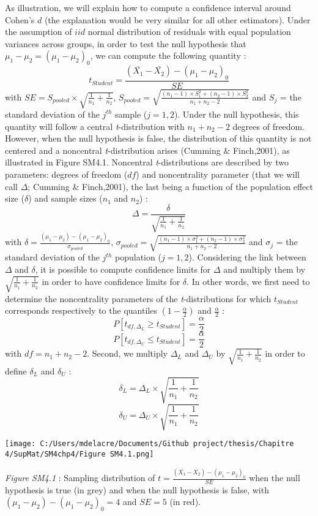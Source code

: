 \documentclass[
  english,
  man,mask,floatsintext]{apa6}
\begin{document}
As illustration, we will explain how to compute a confidence interval around Cohen's \(d\) (the explanation would be very similar for all other estimators). Under the assumption of \(iid\) normal distribution of residuals with equal population variances across groups, in order to test the null hypothesis that \(\mu_1-\mu_2= (\mu_1-\mu_2)_0\), we can compute the following quantity :
\begin{equation*} 
t_{Student}=\frac{(\bar{X_1}-\bar{X_2})-(\mu_1-\mu_2)_0}{SE}
\label{eq:tstudent}
\end{equation*}
with \(SE = S_{pooled} \times \sqrt{\frac{1}{n_1}+\frac{1}{n_2}}\), \(S_{pooled} = \sqrt{\frac{(n_1-1) \times S^2_1+(n_2-1)\times S^2_2}{n_1+n_2-2}}\) and \(S_j\) = the standard deviation of the \(j^{th}\) sample (\(j=1,2\)). Under the null hypothesis, this quantity will follow a central \emph{t}-distribution with \(n_1+n_2-2\) degrees of freedom. However, when the null hypothesis is false, the distribution of this quantity is not centered and a noncentral \emph{t}-distribution arises (Cumming \(\&\) Finch,2001), as illustrated in Figure SM4.1. Noncentral \emph{t}-distributions are described by two parameters: degrees of freedom (\(df\)) and noncentrality parameter (that we will call \(\Delta\); Cumming \(\&\) Finch,2001), the last being a function of the population effect size (\(\delta\)) and sample sizes (\(n_1\) and \(n_2\)) :
\begin{equation*}
\Delta = \frac{\delta}{\sqrt{\frac{1}{n_1}+\frac{1}{n_2}}}
\label{eq:ncp}
\end{equation*}
with \(\delta=\frac{(\mu_1-\mu_2)-(\mu_1-\mu_2)_0}{\sigma_{pooled}}\), \(\sigma_{pooled} = \sqrt{\frac{(n_1-1) \times \sigma^2_1+(n_2-1)\times \sigma^2_2}{n_1+n_2-2}}\) and \(\sigma_j\) = the standard deviation of the \(j^{th}\) population (\(j=1,2\)). Considering the link between \(\Delta\) and \(\delta\), it is possible to compute confidence limits for \(\Delta\) and multiply them by \(\sqrt{\frac{1}{n_1}+\frac{1}{n_2}}\) in order to have confidence limits for \(\delta\). In other words, we first need to determine the noncentrality parameters of the \emph{t}-distributions for which \(t_{Student}\) corresponds respectively to the quantiles \(\left(1-\frac{\alpha}{2}\right)\) and \(\frac{\alpha}{2}\) :
\[P[t_{df, \Delta_L} \geq t_{Student}] = \frac{\alpha}{2} \]
\[P[t_{df, \Delta_U} \leq t_{Student}] = \frac{\alpha}{2} \]
with \(df = n_1+n_2-2\). Second, we multiply \(\Delta_L\) and \(\Delta_U\) by \(\sqrt{\frac{1}{n_1}+\frac{1}{n_2}}\) in order to define \(\delta_L\) and \(\delta_U\) :
\[\delta_L = \Delta_L \times \sqrt{\frac{1}{n_1}+\frac{1}{n_2}}\]
\[\delta_U = \Delta_U \times \sqrt{\frac{1}{n_1}+\frac{1}{n_2}}\]

\texttt{[image: C:/Users/mdelacre/Documents/Github project/thesis/Chapitre 4/SupMat/SM4chp4/Figure SM4.1.png]}

\setlength\parindent{0pt}\emph{Figure SM4.1} : Sampling distribution of \(t=\frac{(\bar{X_1}-\bar{X_2})-(\mu_1-\mu_2)_0}{SE}\) when the null hypothesis is true (in grey) and when the null hypothesis is false, with \((\mu_1-\mu_2)-(\mu_1-\mu_2)_0=4\) and \(SE=5\) (in red).
\end{document}
